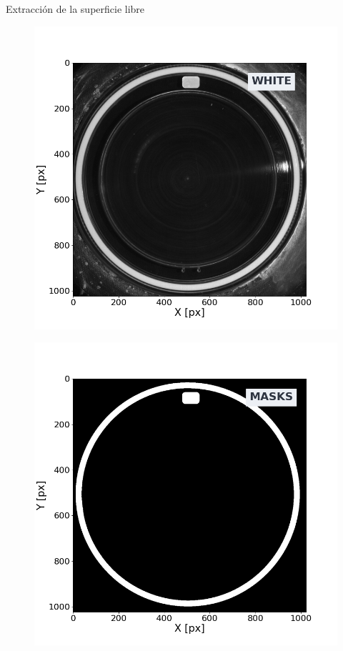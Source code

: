 \documentclass[aspectratio=169]{beamer}
\begin{document}
\begin{frame}{Extracción de la superficie libre} %
	\begin{minipage}{0.49\textwidth}
	  \begin{figure}
	    \includegraphics[width=\linewidth]{figs/ftp_white.png}
	  \end{figure}
	\end{minipage} \hfill
	\begin{minipage}{0.49\textwidth}
	  \begin{figure}
	    \includegraphics[width=\linewidth]{figs/ftp_masks.png}
	  \end{figure}
	\end{minipage}
\end{frame}
\end{document}
